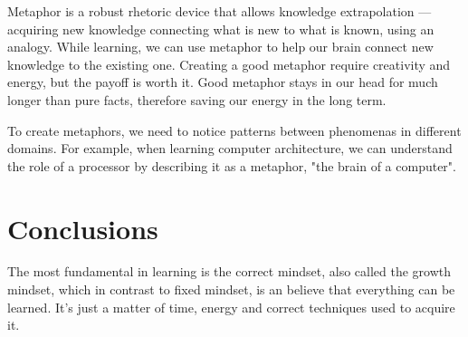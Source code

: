 \documentclass{article}
\begin{document}
Metaphor is a robust rhetoric device that allows knowledge extrapolation — acquiring new knowledge connecting what is new to what is known, using an analogy. While learning, we can use metaphor to help our brain connect new knowledge to the existing one. Creating a good metaphor require creativity and energy, but the payoff is worth it. Good metaphor stays in our head for much longer than pure facts, therefore saving our energy in the long term. 

To create metaphors, we need to notice patterns between phenomenas in different domains.  For example, when learning computer architecture, we can understand the role of a processor by describing it as a metaphor, "the brain of a computer".

\section{Conclusions}

The most fundamental in learning is the correct mindset, also called the growth mindset, which in contrast to fixed mindset, is an believe that everything can be learned. It's just a matter of time, energy and correct techniques used to acquire it. 



\end{document}
